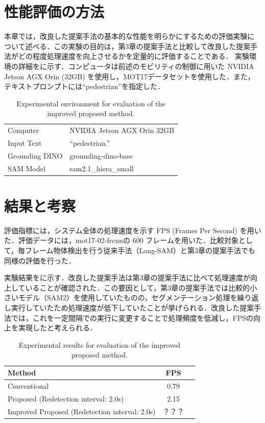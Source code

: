 
\section{性能評価の方法}
本章では，改良した提案手法の基本的な性能を明らかにするための評価実験について述べる．この実験の目的は，第3章の提案手法と比較して改良した提案手法がどの程度処理速度を向上させるかを定量的に評価することである．
実験環境の詳細をに示す．コンピュータは前述のモビリティの制御に用いた NVIDIA Jetson AGX Orin (32GB) を使用し，MOT17データセット\cite{mot16}を使用した．また，テキストプロンプトには“pedestrian”を指定した．

\vspace{1cm}

\begin{table}[htbp]
\centering
\caption{Experimental environment for evaluation of the improved proposed method.}
\label{tab:env_evaluation_improved}
\begin{tabular}{ll}
\hline
Computer & NVIDIA Jetson AGX Orin 32GB \\
Input Text & ``pedestrian.'' \\
Grounding DINO & grounding-dino-base \\
SAM Model & sam2.1\_hiera\_small \\
\hline
\end{tabular}
\end{table}

\newpage

\section{結果と考察}
評価指標には，システム全体の処理速度を示す FPS (Frames Per Second) を用いた．評価データには，mot17-02-frcnnの 600 フレームを用いた．比較対象として，毎フレーム物体検出を行う従来手法（Lang-SAM）と第3章の提案手法でも同様の評価を行った．

実験結果をに示す．改良した提案手法は第3章の提案手法に比べて処理速度が向上していることが確認された．この要因として，第3章の提案手法では比較的小さいモデル（SAM2）を使用していたものの，セグメンテーション処理を繰り返し実行していたため処理速度が低下していたことが挙げられる．改良した提案手法では，これを一定間隔での実行に変更することで処理頻度を低減し，FPSの向上を実現したと考えられる．

\vspace{1cm}

\begin{table}[htbp]
\centering
\caption{Experimental results for evaluation of the improved proposed method.}
\label{tab:results_improved}
\begin{tabular}{lcc}
\hline
Method & FPS \\
\hline
Conventional & 0.79 \\
Proposed (Redetection interval: 2.0s) & 2.15 \\
Improved Proposed (Redetection interval: 2.0s) & ？？？ \\
\hline
\end{tabular}
\end{table}
\newpage
